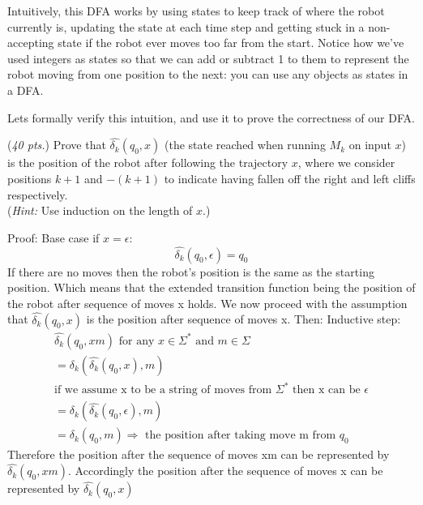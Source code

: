 \documentclass[11pt]{article}
\begin{document}
\begin{qunlist}
  Intuitively, this DFA works by using states to keep track of where the robot currently is, updating the state at each time step and getting stuck in a non-accepting state if the robot ever moves too far from the start.
  Notice how we've used integers as states so that we can add or subtract 1 to them to represent the robot moving from one position to the next: you can use any objects as states in a DFA.

  Lets formally verify this intuition, and use it to prove the correctness of our DFA.

  \begin{qparts}
    \item (\emph{40 pts.})
    Prove that $\widehat{\delta_k}(q_0, x)$ (the state reached when running $M_k$ on input $x$) is the position of the robot after following the trajectory $x$, where we consider positions $k+1$ and $-(k+1)$ to indicate having fallen off the right and left cliffs respectively.\\
    (\emph{Hint:} Use induction on the length of $x$.)
    \begin{solution}
      Proof:\newline
      Base case if $x=\epsilon$:
      \begin{equation}
        \widehat{\delta_k}(q_0, \epsilon) = q_0
      \end{equation}
      If there are no moves then the robot's position is the same as the starting position. Which means that the extended transition function being the position of the robot after sequence of moves x holds. We now proceed with the assumption that $\widehat{\delta_k}(q_0,x)$ is the position after sequence of moves x. Then:\newline\newline
      Inductive step:
      \begin{gather}
        \widehat{\delta_k}(q_0,xm) \mbox{ for any $x \in \Sigma^*$ and $m \in \Sigma$}\\
        = \delta_k(\widehat{\delta_k}(q_0,x),m)\\
        \nonumber\mbox{if we assume x to be a string of moves from $\Sigma^*$ then x can be $\epsilon$}\\
        = \delta_k(\widehat{\delta_k}(q_0,\epsilon),m)\\
        = \delta_k(q_0,m) \Rightarrow \mbox{ the position after taking move m from $q_0$}
      \end{gather}
      Therefore the position after the sequence of moves xm can be represented by $\widehat{\delta_k}(q_0,xm)$. Accordingly the position after the sequence of moves x can be represented by $\widehat{\delta_k}(q_0,x)$
    \end{solution}


\end{qparts}
\end{qunlist}
\end{document}
